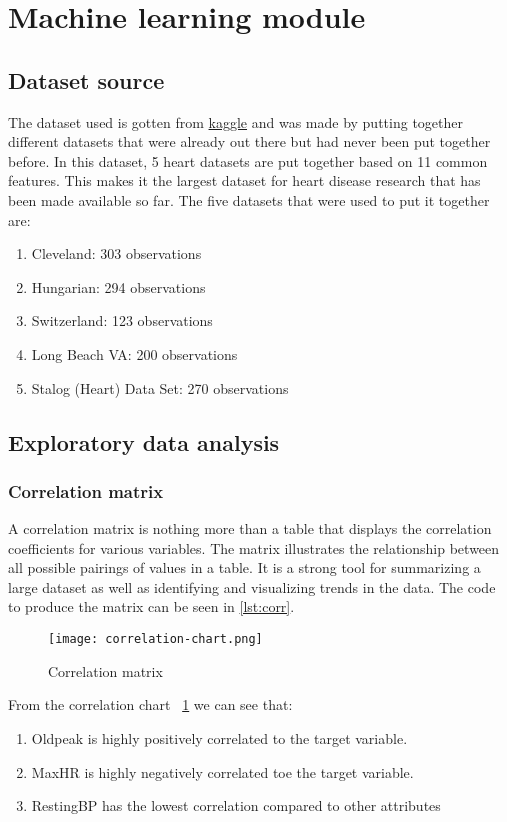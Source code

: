 
\section{Machine learning module}
\subsection{Dataset source}
The dataset used is gotten from \href{https://www.kaggle.com/datasets/fedesoriano/heart-failure-prediction}{kaggle} and was made by putting together different datasets that were already out there but had never been put together before. In this dataset, 5 heart datasets are put together based on 11 common features. This makes it the largest dataset for heart disease research that has been made available so far. The five datasets that were used to put it together are:
\begin{enumerate}[label=(\alph*)]
	\item Cleveland: 303 observations
	\item Hungarian: 294 observations
	\item Switzerland: 123 observations
	\item Long Beach VA: 200 observations
	\item Stalog (Heart) Data Set: 270 observations
\end{enumerate}


\subsection{Exploratory data analysis}

\subsubsection{Correlation matrix}
A correlation matrix is nothing more than a table that displays the correlation coefficients for various variables. The matrix illustrates the relationship between all possible pairings of values in a table. It is a strong tool for summarizing a large dataset as well as identifying and visualizing trends in the data. The code to produce the matrix can be seen in \ref{lst:corr}.


\begin{figure}[htb]
	\centering
	\texttt{[image: correlation-chart.png]}
	\caption{Correlation matrix}
	\label{fig:correlation-chart}
\end{figure}
From the correlation chart \figurename~\ref{fig:correlation-chart} we can see that:
\begin{enumerate}[label=(\roman*)]
	\item{Oldpeak is highly positively correlated to the target variable.}
	\item{MaxHR is highly negatively correlated toe the target variable.}
	\item{RestingBP has the lowest correlation compared to other attributes}
\end{enumerate}
